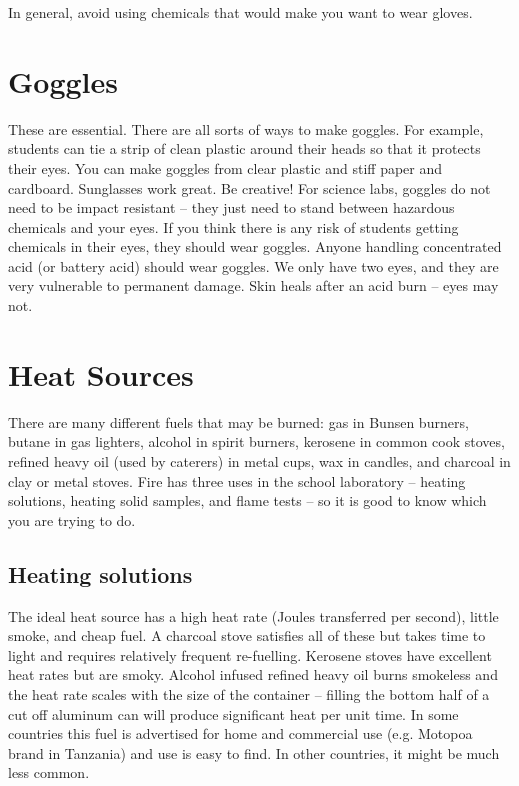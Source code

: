 In general, 
avoid using chemicals that would make you want to wear gloves.

\section{Goggles}
These are essential. 
There are all sorts of ways to make goggles. 
For example, 
students can tie a strip of clean plastic around their heads 
so that it protects their eyes. 
You can make goggles from clear plastic and stiff paper and cardboard. 
Sunglasses work great. 
Be creative! For science labs, 
goggles do not need to be impact resistant -- 
they just need to stand between hazardous chemicals and your eyes. 
If you think there is any risk of students getting chemicals in their eyes, 
they should wear goggles. 
Anyone handling concentrated acid (or battery acid) should wear goggles. 
We only have two eyes, 
and they are very vulnerable to permanent damage. 
Skin heals after an acid burn -- eyes may not.

\section{Heat Sources}
\label{sec:heatsources}
There are many different fuels that may be burned: gas in Bunsen burners, 
butane in gas lighters, 
alcohol in spirit burners, 
kerosene in common cook stoves, 
refined heavy oil (used by caterers) in metal cups, 
wax in candles, 
and charcoal in clay or metal stoves. 
Fire has three uses in the school laboratory -- heating solutions, 
heating solid samples, 
and flame tests -- so it is good to know which you are trying to do.

\subsection{Heating solutions}
The ideal heat source has a high heat rate (Joules transferred per second), 
little smoke, 
and cheap fuel. 
A charcoal stove satisfies all of these 
but takes time to light and requires relatively frequent re-fuelling. 
Kerosene stoves have excellent heat rates but are smoky. 
Alcohol infused refined heavy oil burns smokeless 
and the heat rate scales with the size of the container -- 
filling the bottom half of a cut off aluminum can 
will produce significant heat per unit time. 
In some countries this fuel is advertised for home and commercial use (e.g. 
Motopoa brand in Tanzania) and use is easy to find. 
In other countries, 
it might be much less common.

